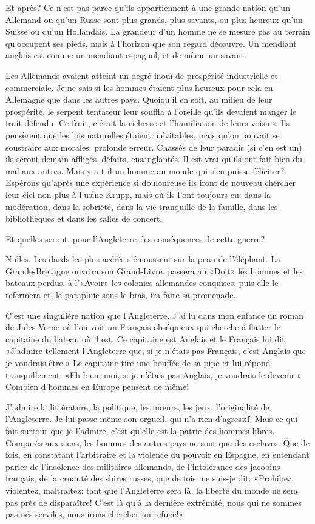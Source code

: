 \begin{chapter}{Et après?}
Ce n'est pas parce qu'ils appartiennent à une grande nation qu'un
Allemand ou qu'un Russe sont plus grands, plus savants, ou plus heureux
qu'un Suisse ou qu'un Hollandais. La grandeur d'un homme ne se mesure
pas au terrain qu'occupent ses pieds, mais à l'horizon que son regard
découvre. Un mendiant anglais est comme un mendiant espagnol, et de même
un savant.

Les Allemands avaient atteint un degré inouï de prospérité industrielle
et commerciale. Je ne sais si les hommes étaient plus heureux pour cela
en Allemagne que dans les autres pays. Quoiqu'il en soit, au milieu de
leur prospérité, le serpent tentateur leur souffla à l'oreille qu'ils
devaient manger le fruit défendu. Ce fruit, c'était la richesse et
l'humiliation de leurs voisins. Ils pensèrent que les lois naturelles
étaient inévitables, mais qu'on pouvait se soustraire aux morales:
profonde erreur. Chassés de leur paradis (si c'en est un) ils seront
demain affligés, défaits, ensanglantés. Il est vrai qu'ils ont fait bien
du mal aux autres. Mais y a-t-il un homme au monde qui s'en puisse
féliciter? Espérons qu'après une expérience si douloureuse ils iront de
nouveau chercher leur ciel non plus à l'usine Krupp, mais où ils l'ont
toujours eu: dans la modération, dans la sobriété, dans la vie
tranquille de la famille, dans les bibliothèques et dans les salles de
concert.

\horizontalLine

Et quelles seront, pour l'Angleterre, les conséquences de cette guerre?

Nulles. Les dards les plus acérés s'émoussent sur la peau de l'éléphant.
La Grande-Bretagne ouvrira son Grand-Livre, passera au «Doit» les hommes
et les bateaux perdus, à l'«Avoir» les colonies allemandes conquises;
puis elle le refermera et, le parapluie sous le bras, ira faire sa
promenade.

C'est une singulière nation que l'Angleterre. J'ai lu dans mon enfance
un roman de Jules Verne où l'on voit un Français obséquieux qui cherche
à flatter le capitaine du bateau où il est. Ce capitaine est Anglais et
le Français lui dit: «J'admire tellement l'Angleterre que, si je n'étais
pas Français, c'est Anglais que je voudrais être.» Le capitaine tire une
bouffée de sa pipe et lui répond tranquillement: «Eh bien, moi, si je
n'étais pas Anglais, je voudrais le devenir.» Combien d'hommes en Europe
pensent de même!

J'admire la littérature, la politique, les mœurs, les jeux,
l'originalité de l'Angleterre. Je lui passe même son orgueil, qui n'a
rien d'agressif. Mais ce qui fait surtout que je l'admire, c'est qu'elle
est la patrie des hommes libres. Comparés aux siens, les hommes des
autres pays ne sont que des esclaves. Que de fois, en constatant
l'arbitraire et la violence du pouvoir en Espagne, en entendant parler
de l'insolence des militaires allemands, de l'intolérance des jacobins
français, de la cruauté des sbires russes, que de fois me suis-je dit:
«Prohibez, violentez, maltraitez: tant que l'Angleterre sera là, la
liberté du monde ne sera pas près de disparaître! C'est là qu'à la
dernière extrémité, nous qui ne sommes pas nés serviles, nous irons
chercher un refuge!»


\end{chapter}

